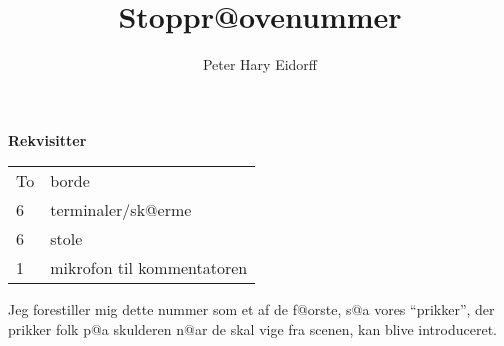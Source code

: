 \documentclass[a4paper,11pt]{article}
\title{Stoppr@ovenummer}
\author{Peter Hary Eidorff}
\begin{document}
\maketitle

\begin{roles}

\strut
{}\strut
{}\strut
\end{roles}

{\bf Rekvisitter}

\begin{tabular}{ll}
To & borde\\
              6& terminaler/sk@erme\\
              6& stole\\
              1& mikrofon til kommentatoren\\
\end{tabular}

Jeg forestiller mig dette nummer som et af de f@orste, s@a vores
``prikker'', der prikker folk p@a skulderen n@ar de skal vige fra
scenen, kan blive introduceret.
\end{document}
